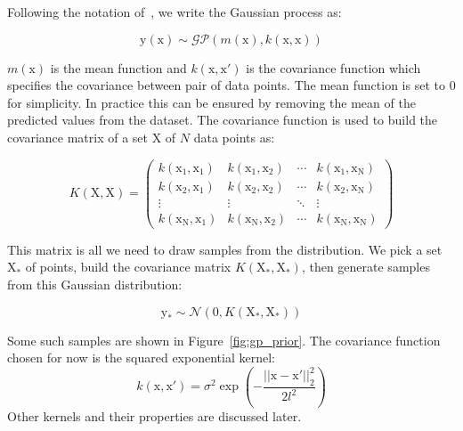 Following the notation of~\textcite{rasmussen2005}, we write the Gaussian process as:

\begin{equation}
    \mathrm{y}(\mathrm{x}) \sim \mathcal{GP} \left( m(\mathrm{x}), k(\mathrm{x}, \mathrm{x}) \right)
\end{equation}

$m(\mathrm{x})$ is the mean function and $k(\mathrm{x}, \mathrm{x'})$ is the covariance function which specifies the covariance between pair of data points. The mean function is set to $0$ for simplicity. In practice this can be ensured by removing the mean of the predicted values from the dataset. The covariance function is used to build the covariance matrix of a set $\mathrm{X}$ of $N$ data points as:

\begin{equation}
    K(\mathrm{X}, \mathrm{X}) = 
    \begin{pmatrix}
    k(\mathrm{x_1}, \mathrm{x_1}) & k(\mathrm{x_1}, \mathrm{x_2}) & \cdots & k(\mathrm{x_1}, \mathrm{x_N}) \\
    k(\mathrm{x_2}, \mathrm{x_1}) & k(\mathrm{x_2}, \mathrm{x_2}) & \cdots & k(\mathrm{x_2}, \mathrm{x_N}) \\
    \vdots & \vdots & \ddots & \vdots \\
    k(\mathrm{x_N}, \mathrm{x_1}) & k(\mathrm{x_N}, \mathrm{x_2}) & \cdots & k(\mathrm{x_N}, \mathrm{x_N})
    \end{pmatrix}
\end{equation}

This matrix is all we need to draw samples from the distribution. We pick a set $\mathrm{X_*}$ of points, build the covariance matrix $K(\mathrm{X_*}, \mathrm{X_*})$, then generate samples from this Gaussian distribution:

\begin{equation}
    \mathrm{y_*} \sim \mathcal{N} \left( 0, K(\mathrm{X_*}, \mathrm{X_*})\right)
\end{equation}

Some such samples are shown in Figure~\ref{fig:gp_prior}. The covariance function chosen for now is the squared exponential kernel:
\begin{equation}
	k(\mathrm{x}, \mathrm{x'}) = \sigma^2 \exp\left( -\frac{||\mathrm{x} - \mathrm{x'}||_2^2}{2l^2}\right)
	\label{eq:sqexp}
\end{equation}
Other kernels and their properties are discussed later. 


